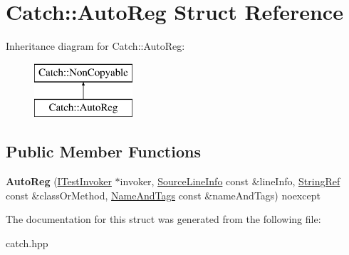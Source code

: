 \hypertarget{structCatch_1_1AutoReg}{}\section{Catch\+::Auto\+Reg Struct Reference}
\label{structCatch_1_1AutoReg}
Inheritance diagram for Catch\+::Auto\+Reg\+:\begin{figure}[H]
\begin{center}
\leavevmode
\includegraphics[height=2.000000cm]{structCatch_1_1AutoReg}
\end{center}
\end{figure}
\subsection*{Public Member Functions}
\begin{DoxyCompactItemize}
\item 
\mbox{\label{structCatch_1_1AutoReg_a7eba02fb9d80b9896bf5a6517369af28}} 
{\bfseries Auto\+Reg} (\mbox{\hyperlink{structCatch_1_1ITestInvoker}{I\+Test\+Invoker}} $\ast$invoker, \mbox{\hyperlink{structCatch_1_1SourceLineInfo}{Source\+Line\+Info}} const \&line\+Info, \mbox{\hyperlink{classCatch_1_1StringRef}{String\+Ref}} const \&class\+Or\+Method, \mbox{\hyperlink{structCatch_1_1NameAndTags}{Name\+And\+Tags}} const \&name\+And\+Tags) noexcept
\end{DoxyCompactItemize}


The documentation for this struct was generated from the following file\+:\begin{DoxyCompactItemize}
\item 
catch.\+hpp\end{DoxyCompactItemize}
